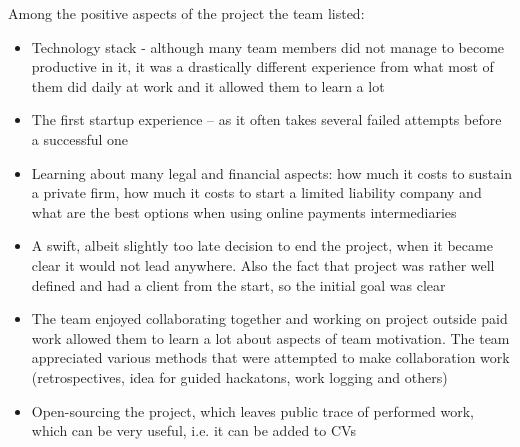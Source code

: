 \documentclass{article}
\begin{document}
Among the positive aspects of the project the team listed:
\begin{itemize}
\item Technology stack - although many team members did not manage to become productive in it, it was a drastically different experience from what most of them did daily at work and it allowed them to learn a lot
\item The first startup experience – as it often takes several failed attempts before a successful one
\item Learning about many legal and financial aspects: how much it costs to sustain a private firm, how much it costs to start a limited liability company and what are the best options when using online payments intermediaries
\item A swift, albeit slightly too late decision to end the project, when it became clear it would not lead anywhere. Also the fact that project was rather well defined and had a client from the start, so the initial goal was clear
\item The team enjoyed collaborating together and working on project outside paid work allowed them to learn a lot about aspects of team motivation. The team appreciated various methods that were attempted to make collaboration work (retrospectives, idea for guided hackatons, work logging and others)
\item Open-sourcing the project, which leaves public trace of performed work, which can be very useful, i.e. it can be added to CVs
\end{itemize}
\end{document}

